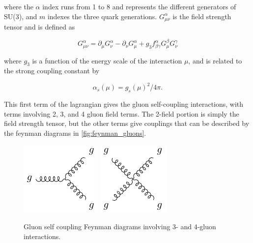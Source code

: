 where the $\alpha$ index runs from 1 to 8 and represents the different generators of SU(3), and $m$ indexes the three quark generations. $G^\alpha_{\mu\nu}$ is the field strength tensor and is defined as

\begin{equation}
G^\alpha_{\mu\nu} = \partial_\mu G^\alpha_\nu - \partial_\nu G^\alpha_\mu + g_3 f^\alpha_{\beta\gamma}G^\beta_\mu G^\gamma_\nu
\end{equation}

where $g_3$ is a function of the energy scale of the interaction $\mu$, and is related to the strong coupling constant by

\begin{equation}
\alpha_s(\mu) =  g_s(\mu)^2 / 4\pi . 
\end{equation}

This first term of the lagrangian gives the gluon self-coupling interactions, with terms involving 2, 3, and 4 gluon field terms. The 2-field portion is simply the field strength tensor, but the other terms give couplings that can be described by the feynman diagrams in \autoref{fig:feynman_gluons}.

\begin{centering}
\begin{figure}[!hbt]
\myfloatalign
\includegraphics[width=.45\linewidth]{feynman/gluon_3.pdf}
\includegraphics[width=.4\linewidth]{feynman/gluon_4.pdf}
\caption{Gluon self coupling Feynman diagrams involving 3- and 4-gluon interactions.}
\label{fig:feynman_gluons}
\end{figure}
\end{centering}

